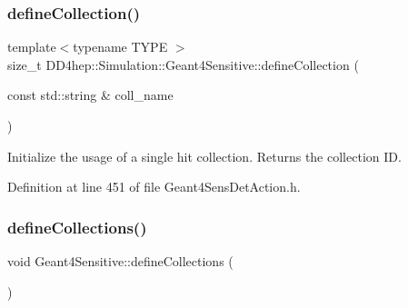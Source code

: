 \hypertarget{class_d_d4hep_1_1_simulation_1_1_geant4_sensitive_afd3ff7bc96a59196616058f70eefb1b9}{}\label{class_d_d4hep_1_1_simulation_1_1_geant4_sensitive_afd3ff7bc96a59196616058f70eefb1b9} 
\subsubsection{\texorpdfstring{define\+Collection()}{defineCollection()}}
{\footnotesize\ttfamily template$<$typename T\+Y\+PE $>$ \\
size\+\_\+t D\+D4hep\+::\+Simulation\+::\+Geant4\+Sensitive\+::define\+Collection (\begin{DoxyParamCaption}\item[{const std\+::string \&}]{coll\+\_\+name }\end{DoxyParamCaption})\hspace{0.3cm}{\ttfamily [inline]}}



Initialize the usage of a single hit collection. Returns the collection ID. 



Definition at line 451 of file Geant4\+Sens\+Det\+Action.\+h.

\hypertarget{class_d_d4hep_1_1_simulation_1_1_geant4_sensitive_a88c872b79e49e399c8ee282960c2d77d}{}\label{class_d_d4hep_1_1_simulation_1_1_geant4_sensitive_a88c872b79e49e399c8ee282960c2d77d} 
\subsubsection{\texorpdfstring{define\+Collections()}{defineCollections()}}
{\footnotesize\ttfamily void Geant4\+Sensitive\+::define\+Collections (\begin{DoxyParamCaption}{ }\end{DoxyParamCaption})\hspace{0.3cm}{\ttfamily [virtual]}}




